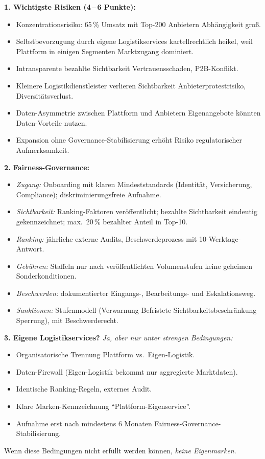\documentclass[11pt,a4paper,oneside]{article}
\begin{document}
\begin{loesungbox}
\textbf{1. Wichtigste Risiken (4\,--\,6 Punkte):}
\begin{itemize}
  \item Konzentrationsrisiko: 65\,\% Umsatz mit Top-200 Anbietern \textendash{} Abhängigkeit groß.
  \item Selbstbevorzugung durch eigene Logistikservices \textendash{} kartellrechtlich heikel, weil Plattform in einigen Segmenten Marktzugang dominiert.
  \item Intransparente bezahlte Sichtbarkeit \textendash{} Vertrauensschaden, P2B-Konflikt.
  \item Kleinere Logistikdienstleister verlieren Sichtbarkeit \textendash{} Anbieterprotestrisiko, Diversitätsverlust.
  \item Daten-Asymmetrie zwischen Plattform und Anbietern \textendash{} Eigenangebote könnten Daten-Vorteile nutzen.
  \item Expansion ohne Governance-Stabilisierung erhöht Risiko regulatorischer Aufmerksamkeit.
\end{itemize}

\textbf{2. Fairness-Governance:}
\begin{itemize}
  \item \emph{Zugang:} Onboarding mit klaren Mindeststandards (Identität, Versicherung, Compliance); diskriminierungsfreie Aufnahme.
  \item \emph{Sichtbarkeit:} Ranking-Faktoren veröffentlicht; bezahlte Sichtbarkeit eindeutig gekennzeichnet; max.\ 20\,\% bezahlter Anteil in Top-10.
  \item \emph{Ranking:} jährliche externe Audits, Beschwerdeprozess mit 10-Werktage-Antwort.
  \item \emph{Gebühren:} Staffeln nur nach veröffentlichten Volumenstufen \textendash{} keine geheimen Sonderkonditionen.
  \item \emph{Beschwerden:} dokumentierter Eingangs-, Bearbeitungs- und Eskalationsweg.
  \item \emph{Sanktionen:} Stufenmodell (Verwarnung \textrightarrow{} Befristete Sichtbarkeitsbeschränkung \textrightarrow{} Sperrung), mit Beschwerderecht.
\end{itemize}

\textbf{3. Eigene Logistikservices?}
\emph{Ja, aber nur unter strengen Bedingungen:}
\begin{itemize}
  \item Organisatorische Trennung Plattform vs.\ Eigen-Logistik.
  \item Daten-Firewall (Eigen-Logistik bekommt nur aggregierte Marktdaten).
  \item Identische Ranking-Regeln, externes Audit.
  \item Klare Marken-Kennzeichnung ``Plattform-Eigenservice''.
  \item Aufnahme erst nach mindestens 6 Monaten Fairness-Governance-Stabilisierung.
\end{itemize}
Wenn diese Bedingungen nicht erfüllt werden können, \emph{keine Eigenmarken}.


\end{loesungbox}
\end{document}
